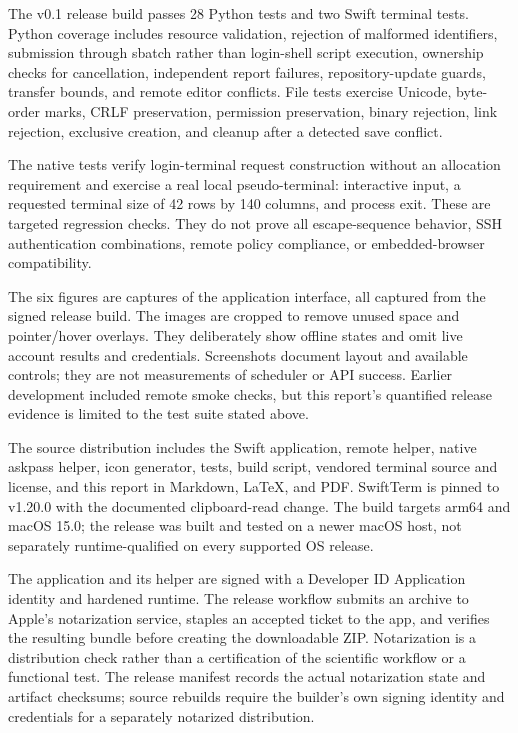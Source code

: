 \documentclass[manuscript,screen,nonacm]{acmart}
\begin{document}
The v0.1 release build passes 28 Python tests and two Swift terminal tests. Python coverage includes resource validation, rejection of malformed identifiers, submission through sbatch rather than login-shell script execution, ownership checks for cancellation, independent report failures, repository-update guards, transfer bounds, and remote editor conflicts. File tests exercise Unicode, byte-order marks, CRLF preservation, permission preservation, binary rejection, link rejection, exclusive creation, and cleanup after a detected save conflict.

The native tests verify login-terminal request construction without an allocation requirement and exercise a real local pseudo-terminal: interactive input, a requested terminal size of 42 rows by 140 columns, and process exit. These are targeted regression checks. They do not prove all escape-sequence behavior, SSH authentication combinations, remote policy compliance, or embedded-browser compatibility.

The six figures are captures of the application interface, all captured from the signed release build. The images are cropped to remove unused space and pointer/hover overlays. They deliberately show offline states and omit live account results and credentials. Screenshots document layout and available controls; they are not measurements of scheduler or API success. Earlier development included remote smoke checks, but this report's quantified release evidence is limited to the test suite stated above.

The source distribution includes the Swift application, remote helper, native askpass helper, icon generator, tests, build script, vendored terminal source and license, and this report in Markdown, LaTeX, and PDF. SwiftTerm is pinned to v1.20.0 with the documented clipboard-read change. The build targets arm64 and macOS 15.0; the release was built and tested on a newer macOS host, not separately runtime-qualified on every supported OS release.

The application and its helper are signed with a Developer ID Application identity and hardened runtime. The release workflow submits an archive to Apple's notarization service, staples an accepted ticket to the app, and verifies the resulting bundle before creating the downloadable ZIP. Notarization is a distribution check rather than a certification of the scientific workflow or a functional test. The release manifest records the actual notarization state and artifact checksums; source rebuilds require the builder's own signing identity and credentials for a separately notarized distribution.
\end{document}
